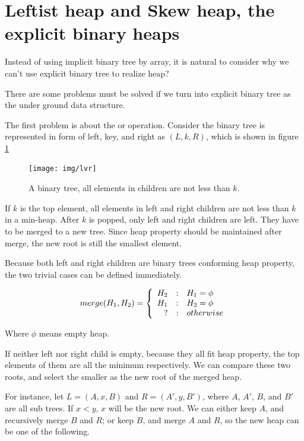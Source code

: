 \documentclass[b5paper]{article}
\begin{document}
\section{Leftist heap and Skew heap, the explicit binary heaps}
\label{ebheap}

Instead of using implicit binary tree by array, it is natural to
consider why we can't use explicit binary tree to realize heap?

There are some problems must be solved if we turn into explicit
binary tree as the under ground data structure.

The first problem is about the  or  operation.
Consider the binary tree is represented in form of left, key, and right as
$(L, k, R)$, which is shown in figure \ref{fig:lvr}

\begin{figure}[htbp]
    \centering
    \texttt{[image: img/lvr]}
    \caption{A binary tree, all elements in children are not less than $k$.} \label{fig:lvr}
\end{figure}

If $k$ is the top element, all elements in left and right children are not less
than $k$ in a min-heap. After $k$ is popped, only left and right children are left.
They have to be merged to a new tree. Since heap property should be maintained
after merge, the new root is still the smallest element.

Because both left and right children are binary trees conforming heap property,
the two trivial cases can be defined immediately.

\[
merge(H_1, H_2) = \left \{
  \begin{array}
  {r@{\quad:\quad}l}
  H_2 & H_1 = \phi \\
  H_1 & H_2 = \phi \\
  ? & otherwise
  \end{array}
\right.
\]

Where $\phi$ means empty heap.

If neither left nor right child is empty, because they all fit
heap property, the top elements of them are all the minimum respectively.
We can compare these two roots,
and select the smaller as the new root of the merged heap.

For instance, let $L = (A, x, B)$ and $R = (A', y, B')$, where $A$, $A'$, $B$,
and $B'$ are all sub trees. If $x < y$, $x$ will be the new root.
We can either keep $A$, and recursively merge $B$ and $R$; or
keep $B$, and merge $A$ and $R$, so the new heap can be one
of the following.
\end{document}
